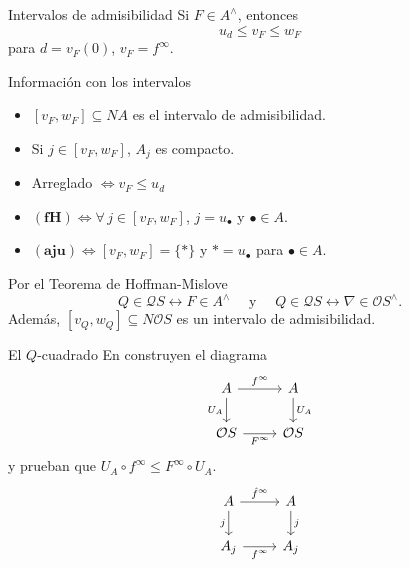 \documentclass[compress,12pt]{beamer}
\newtheorem{prop}{Proposición}
\begin{document}
\begin{frame}{Intervalos de admisibilidad}
Si $F\in A^\wedge$, entonces 
\[
u_d\leq v_F \leq  w_F
\] 
para $d=v_F(0)$, $v_F=f^\infty$.

\begin{block}{Información con los intervalos}
\begin{itemize}
\item<2-> $[v_F, w_F]\subseteq NA$ es el intervalo de admisibilidad.
\item<3-> Si $j\in [v_F,w_F]$, $A_j$ es compacto.
\item<4-> Arreglado $\Leftrightarrow v_F\leq u_d$
\item<5-> $\mathbf{(fH)}\Leftrightarrow\forall\, j\in [v_F,w_F]$, $j=u_\bullet$ y $\bullet\in A$.  
\item<6-> $\mathbf{(aju)}\Leftrightarrow [v_F,w_F]=\{*\}$ y $*=u_\bullet$ para $\bullet\in A$. 
\end{itemize}
\end{block}
\end{frame}

\begin{frame}
Por el Teorema de Hoffman-Mislove 
\[
Q\in \mathcal{Q}S\leftrightarrow F\in A^\wedge\quad \mbox{ y } \quad Q\in \mathcal{Q}S\leftrightarrow \nabla\in \mathcal{O}S^\wedge.
\]
Además, $[v_Q, w_Q]\subseteq N\mathcal{O}S$ es un intervalo de admisibilidad.

\end{frame}

\begin{frame}[fragile]{El $Q$-cuadrado}
En \cite{H.S.V} construyen el diagrama
\[\begin{tikzcd}
	A & A \\
	{\mathcal{O}S} & {\mathcal{O}S}
	\arrow["{f^\infty}", from=1-1, to=1-2]
	\arrow["{U_A}"', from=1-1, to=2-1]
	\arrow["{U_A}", from=1-2, to=2-2]
	\arrow["{F^\infty}"', from=2-1, to=2-2]
\end{tikzcd}\]
y prueban que $U_A\circ f^\infty\leq F^\infty \circ U_A$.\\
	
\[\begin{tikzcd}
	A & A \\
	{A_j} & {A_j}
	\arrow["{\hat{f}^\infty}", from=1-1, to=1-2]
	\arrow["{j}"', from=1-1, to=2-1]
	\arrow["{j}", from=1-2, to=2-2]
	\arrow["{f^\infty}"', from=2-1, to=2-2]
\end{tikzcd}\]
\end{frame}
\end{document}
